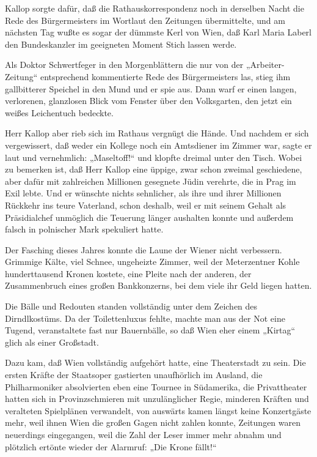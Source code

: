 Kallop sorgte dafür, daß die Rathauskorrespondenz noch in derselben
Nacht die Rede des Bürgermeisters im Wortlaut den Zeitungen
übermittelte, und am nächsten Tag wußte es sogar der dümmste Kerl
von Wien, daß Karl Maria Laberl den Bundeskanzler im geeigneten
Moment  Stich lassen werde.

Als Doktor Schwertfeger in den Morgenblättern die nur von der
„Arbeiter-Zeitung“ entsprechend kommentierte Rede des
Bürgermeisters las, stieg ihm gallbitterer Speichel in den Mund und
er spie aus. Dann warf er einen langen, verlorenen, glanzlosen
Blick vom Fenster über den Volksgarten, den jetzt ein weißes
Leichentuch bedeckte.

Herr Kallop aber rieb sich im Rathaus vergnügt die Hände. Und
nachdem er sich vergewissert, daß weder ein Kollege noch ein
Amtsdiener im Zimmer war, sagte er laut und vernehmlich:
„Maseltoff!“ und klopfte dreimal unter  den Tisch.
Wobei zu bemerken ist, daß Herr Kallop eine üppige, zwar schon
zweimal geschiedene, aber dafür mit zahlreichen Millionen gesegnete
Jüdin verehrte, die in Prag im Exil lebte. Und er wünschte nichts
sehnlicher, als ihre und ihrer Millionen Rückkehr ins teure
Vaterland, schon deshalb, weil er mit seinem Gehalt als
Präsidialchef unmöglich die Teuerung länger aushalten konnte und
außerdem falsch in polnischer Mark spekuliert hatte.

\tb{* * *}
Der Fasching dieses Jahres konnte die Laune der Wiener nicht
verbessern. Grimmige Kälte, viel Schnee, ungeheizte Zimmer, weil
der Meterzentner Kohle hunderttausend Kronen kostete, eine Pleite
nach der anderen, der Zusammenbruch eines großen Bankkonzerns, bei
dem viele ihr Geld liegen hatten.

Die Bälle und Redouten standen vollständig unter dem Zeichen des
Dirndlkostüms. Da der Toilettenluxus fehlte, machte man aus der Not
eine Tugend, veranstaltete fast nur Bauernbälle, so daß Wien eher
einem „Kirtag“ glich als einer Großstadt.

Dazu kam, daß Wien vollständig aufgehört hatte, eine Theaterstadt
zu sein. Die ersten Kräfte der Staatsoper gastierten unaufhörlich
im Ausland, die Philharmoniker absolvierten eben eine Tournee in
Südamerika, die Privattheater hatten sich in Provinzschmieren mit
unzulänglicher Regie, minderen Kräften und veralteten Spielplänen
verwandelt, von auswärts kamen längst keine Konzertgäste mehr, weil
ihnen Wien die großen Gagen nicht zahlen  konnte,
Zeitungen waren neuerdings eingegangen, weil die Zahl der Leser
immer mehr abnahm und plötzlich ertönte wieder der Alarmruf: „Die
Krone fällt!“

